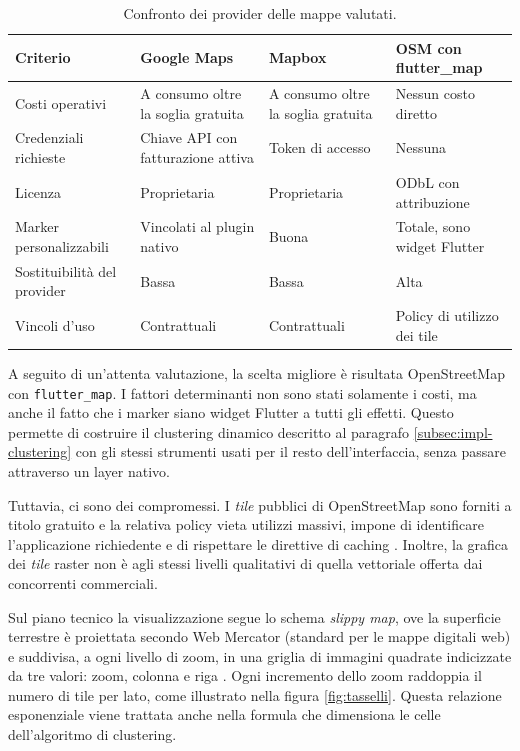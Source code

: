 \begin{table}[H]
\centering
\footnotesize
\begin{tabularx}{\textwidth}{@{}l L L L@{}}
\toprule
\textbf{Criterio} & \textbf{Google Maps} & \textbf{Mapbox} & \textbf{OSM con flutter\_map} \tabularnewline
\midrule
Costi operativi & A consumo oltre la soglia gratuita & A consumo oltre la soglia gratuita & Nessun costo diretto \tabularnewline
Credenziali richieste & Chiave API con fatturazione attiva & Token di accesso & Nessuna \tabularnewline
Licenza & Proprietaria & Proprietaria & ODbL con attribuzione \tabularnewline
Marker personalizzabili & Vincolati al plugin nativo & Buona & Totale, sono widget Flutter \tabularnewline
Sostituibilità del provider & Bassa & Bassa & Alta \tabularnewline
Vincoli d'uso & Contrattuali & Contrattuali & Policy di utilizzo dei tile \tabularnewline
\bottomrule
\end{tabularx}
\caption{Confronto dei provider delle mappe valutati.}
\label{tab:confronto-piattaforme}
\end{table}

A seguito di un'attenta valutazione, la scelta migliore è risultata OpenStreetMap con \texttt{flutter\_map}.
I fattori determinanti non sono stati solamente i costi, ma anche il fatto che i marker siano widget Flutter
a tutti gli effetti.
Questo permette di costruire il clustering dinamico descritto al paragrafo \ref{subsec:impl-clustering}
con gli stessi strumenti usati per il resto dell'interfaccia, senza passare attraverso un layer nativo.

Tuttavia, ci sono dei compromessi.
I \textit{tile} pubblici di OpenStreetMap sono forniti a titolo gratuito e la relativa policy vieta utilizzi massivi, impone di
identificare l'applicazione richiedente e di rispettare le direttive di caching \cite{osmTilePolicy}.
Inoltre, la grafica dei \textit{tile} raster non è agli stessi livelli qualitativi di quella vettoriale offerta dai concorrenti commerciali.

Sul piano tecnico la visualizzazione segue lo schema \emph{slippy map}, ove la superficie terrestre è proiettata secondo Web Mercator
(standard per le mappe digitali web) e suddivisa, a ogni livello di zoom, in una griglia di immagini quadrate indicizzate
da tre valori: zoom, colonna e riga \cite{slippyMap}.
Ogni incremento dello zoom raddoppia il numero di tile per lato, come illustrato nella figura \ref{fig:tasselli}.
Questa relazione esponenziale viene trattata anche nella formula che dimensiona le celle dell'algoritmo di clustering.

